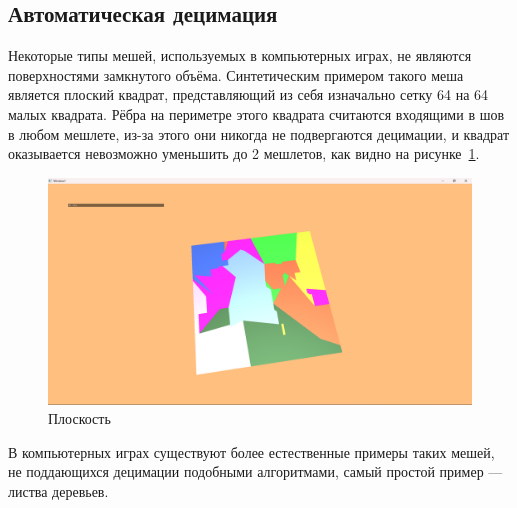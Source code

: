 \subsection*{Автоматическая децимация}
Некоторые типы мешей, используемых в компьютерных играх, не являются поверхностями замкнутого объёма.
Синтетическим примером такого меша является плоский квадрат, представляющий из себя изначально сетку 64 на 64 малых квадрата.
Рёбра на периметре этого квадрата считаются входящими в шов в любом мешлете, из-за этого они никогда не подвергаются децимации, и квадрат оказывается невозможно уменьшить до 2 мешлетов, как видно на рисунке~\ref{fig:plane-1}.
\begin{figure}[h]
    \centering
    \includegraphics[width=\textwidth]{plane1.png}
    \caption{Плоскость}
    \label{fig:plane-1}
\end{figure}

В компьютерных играх существуют более естественные примеры таких мешей, не поддающихся децимации подобными алгоритмами, самый простой пример --- листва деревьев.
